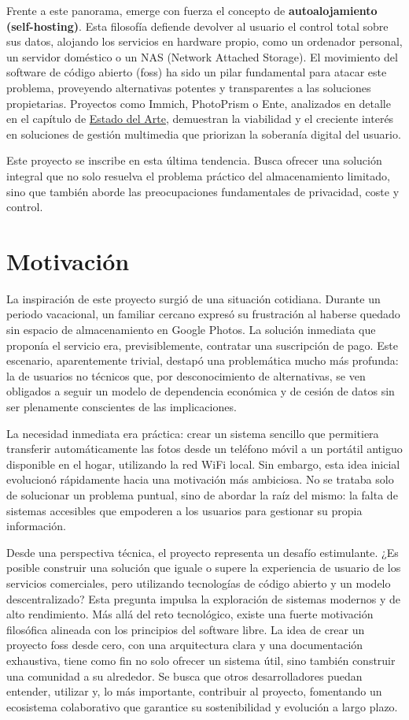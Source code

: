 Frente a este panorama, emerge con fuerza el concepto de \textbf{autoalojamiento (self-hosting)}. Esta filosofía defiende devolver al usuario el control total sobre sus datos, alojando los servicios en hardware propio, como un ordenador personal, un servidor doméstico o un NAS (Network Attached Storage). El movimiento del software de código abierto (\acrfull{foss}) ha sido un pilar fundamental para atacar este problema, proveyendo alternativas potentes y transparentes a las soluciones propietarias. Proyectos como Immich, PhotoPrism o Ente, analizados en detalle en el capítulo de \hyperref[sec:estado_del_arte]{Estado del Arte}, demuestran la viabilidad y el creciente interés en soluciones de gestión multimedia que priorizan la soberanía digital del usuario.

Este proyecto se inscribe en esta última tendencia. Busca ofrecer una solución integral que no solo resuelva el problema práctico del almacenamiento limitado, sino que también aborde las preocupaciones fundamentales de privacidad, coste y control.
\section{Motivación}

La inspiración de este proyecto surgió de una situación cotidiana. Durante un periodo vacacional, un familiar cercano expresó su frustración al haberse quedado sin espacio de almacenamiento en Google Photos. La solución inmediata que proponía el servicio era, previsiblemente, contratar una suscripción de pago. Este escenario, aparentemente trivial, destapó una problemática mucho más profunda: la de usuarios no técnicos que, por desconocimiento de alternativas, se ven obligados a seguir un modelo de dependencia económica y de cesión de datos sin ser plenamente conscientes de las implicaciones.

La necesidad inmediata era práctica: crear un sistema sencillo que permitiera transferir automáticamente las fotos desde un teléfono móvil a un portátil antiguo disponible en el hogar, utilizando la red WiFi local. Sin embargo, esta idea inicial evolucionó rápidamente hacia una motivación más ambiciosa. No se trataba solo de solucionar un problema puntual, sino de abordar la raíz del mismo: la falta de sistemas accesibles que empoderen a los usuarios para gestionar su propia información.

Desde una perspectiva técnica, el proyecto representa un desafío estimulante. ¿Es posible construir una solución que iguale o supere la experiencia de usuario de los servicios comerciales, pero utilizando tecnologías de código abierto y un modelo descentralizado? Esta pregunta impulsa la exploración de sistemas modernos y de alto rendimiento.
Más allá del reto tecnológico, existe una fuerte motivación filosófica alineada con los principios del software libre. La idea de crear un proyecto \acrshort{foss} desde cero, con una arquitectura clara y una documentación exhaustiva, tiene como fin no solo ofrecer un sistema útil, sino también construir una comunidad a su alrededor. Se busca que otros desarrolladores puedan entender, utilizar y, lo más importante, contribuir al proyecto, fomentando un ecosistema colaborativo que garantice su sostenibilidad y evolución a largo plazo.

